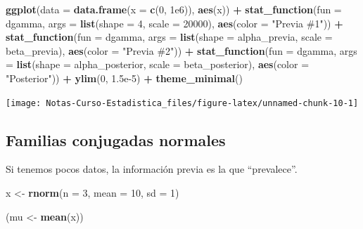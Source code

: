\documentclass[
  12pt,
]{book}
\newenvironment{Shaded}{\begin{snugshade}}{\end{snugshade}}
\newcommand{\DataTypeTok}[1]{\textcolor[rgb]{0.13,0.29,0.53}{#1}}
\newcommand{\DecValTok}[1]{\textcolor[rgb]{0.00,0.00,0.81}{#1}}
\newcommand{\FloatTok}[1]{\textcolor[rgb]{0.00,0.00,0.81}{#1}}
\newcommand{\KeywordTok}[1]{\textcolor[rgb]{0.13,0.29,0.53}{\textbf{#1}}}
\newcommand{\NormalTok}[1]{#1}
\newcommand{\OperatorTok}[1]{\textcolor[rgb]{0.81,0.36,0.00}{\textbf{#1}}}
\newcommand{\StringTok}[1]{\textcolor[rgb]{0.31,0.60,0.02}{#1}}
\begin{document}
\begin{Shaded}
\begin{Highlighting}[]
\KeywordTok{ggplot}\NormalTok{(}\DataTypeTok{data =} \KeywordTok{data.frame}\NormalTok{(}\DataTypeTok{x =} \KeywordTok{c}\NormalTok{(}\DecValTok{0}\NormalTok{, }\FloatTok{1e6}\NormalTok{)), }\KeywordTok{aes}\NormalTok{(x)) }\OperatorTok{+}
\StringTok{  }\KeywordTok{stat\_function}\NormalTok{(}\DataTypeTok{fun =}\NormalTok{ dgamma, }\DataTypeTok{args =} \KeywordTok{list}\NormalTok{(}\DataTypeTok{shape =} \DecValTok{4}\NormalTok{, }\DataTypeTok{scale =} \DecValTok{20000}\NormalTok{), }\KeywordTok{aes}\NormalTok{(}\DataTypeTok{color =} \StringTok{"Previa \#1"}\NormalTok{)) }\OperatorTok{+}
\StringTok{  }\KeywordTok{stat\_function}\NormalTok{(}\DataTypeTok{fun =}\NormalTok{ dgamma, }\DataTypeTok{args =} \KeywordTok{list}\NormalTok{(}\DataTypeTok{shape =}\NormalTok{ alpha\_previa, }\DataTypeTok{scale =}\NormalTok{ beta\_previa), }\KeywordTok{aes}\NormalTok{(}\DataTypeTok{color =} \StringTok{"Previa \#2"}\NormalTok{)) }\OperatorTok{+}
\StringTok{  }\KeywordTok{stat\_function}\NormalTok{(}\DataTypeTok{fun =}\NormalTok{ dgamma, }\DataTypeTok{args =} \KeywordTok{list}\NormalTok{(}\DataTypeTok{shape =}\NormalTok{ alpha\_posterior, }\DataTypeTok{scale =}\NormalTok{ beta\_posterior), }\KeywordTok{aes}\NormalTok{(}\DataTypeTok{color =} \StringTok{"Posterior"}\NormalTok{)) }\OperatorTok{+}
\StringTok{  }\KeywordTok{ylim}\NormalTok{(}\DecValTok{0}\NormalTok{, }\FloatTok{1.5e{-}5}\NormalTok{) }\OperatorTok{+}
\StringTok{  }\KeywordTok{theme\_minimal}\NormalTok{()}
\end{Highlighting}
\end{Shaded}

\begin{center}\texttt{[image: Notas-Curso-Estadistica\_files/figure-latex/unnamed-chunk-10-1]} \end{center}

\hypertarget{familias-conjugadas-normales}{%
\subsection{Familias conjugadas normales}\label{familias-conjugadas-normales}}

Si tenemos pocos datos, la información previa es la que ``prevalece''.

\begin{Shaded}
\begin{Highlighting}[]
\NormalTok{x \textless{}{-}}\StringTok{ }\KeywordTok{rnorm}\NormalTok{(}\DataTypeTok{n =} \DecValTok{3}\NormalTok{, }\DataTypeTok{mean =} \DecValTok{10}\NormalTok{, }\DataTypeTok{sd =} \DecValTok{1}\NormalTok{)}

\NormalTok{(mu \textless{}{-}}\StringTok{ }\KeywordTok{mean}\NormalTok{(x))}
\end{Highlighting}
\end{Shaded}
\end{document}
